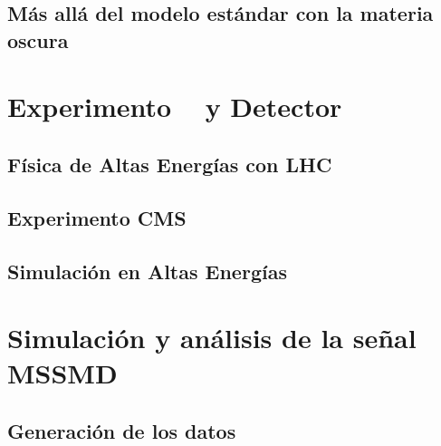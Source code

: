 \documentclass[12pt]{report}
\begin{document}
	\section{M\'as all\'a del modelo est\'andar con la materia oscura}
	
				


\chapter{Experimento \LHC ~ y Detector \CMS}

		
	\section{Física de Altas Energías con LHC}
	
	
	\section{Experimento CMS}\label{Experimento_CMS}
	

		
	\section{Simulación en Altas Energías}
	
	


\chapter{Simulación y análisis de la señal MSSMD}


    
    \section{Generación de los datos}\label{Cap_genera}
    
        
\end{document}
